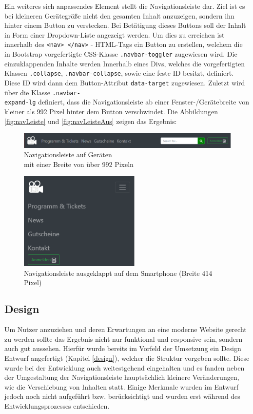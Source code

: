 	Ein weiteres sich anpassendes Element stellt die Navigationsleiste dar. Ziel ist es bei kleineren Gerätegröße nicht den gesamten Inhalt anzuzeigen, sondern ihn hinter einem Button zu verstecken. Bei Betätigung dieses Buttons soll der Inhalt in Form einer Dropdown-Liste angezeigt werden. Um dies zu erreichen ist innerhalb des \texttt{<nav> </nav>} - HTML-Tags ein Button zu erstellen, welchem die in Bootstrap vorgefertigte CSS-Klasse \texttt{.navbar-toggler} zugewiesen wird. Die einzuklappenden Inhalte werden Innerhalb eines Divs, welches die vorgefertigten Klassen \texttt{.collapse}, \texttt{.navbar-collapse}, sowie eine feste ID besitzt, definiert. Diese ID wird dann dem Button-Attribut \texttt{data-target} zugewiesen. Zuletzt wird über die Klasse \texttt{.navbar-\\expand-lg} definiert, dass die Navigationsleiste ab einer Fenster-/Gerätebreite von kleiner als 992 Pixel hinter dem Button verschwindet. Die Abbildungen \vref{fig:navLeiste} und \vref{fig:navLeisteAus} zeigen das Ergebnis:
	\begin{figure}[H]
		\centering 
		\includegraphics[width=13cm]{img/navLeiste.png}
		\captionsetup{format=hang}
		\caption[Navigationsleiste]{\label{fig:navLeiste} Navigationsleiste auf Geräten\\ mit einer Breite von über 992 Pixeln}
	\end{figure}
	
	\begin{figure}[H]
		\centering 
		\includegraphics[width=6cm]{img/navLeisteAus.png}
		\captionsetup{format=hang}
		\caption[Navigationsleiste ausgeklappt]{\label{fig:navLeisteAus} Navigationsleiste ausgeklappt auf dem Smartphone (Breite 414 Pixel)}
	\end{figure}

	\subsection{Design}
	Um Nutzer anzuziehen und deren Erwartungen an eine moderne Website gerecht zu werden sollte das Ergebnis nicht nur funktional und responsive sein, sondern auch gut aussehen. Hierfür wurde bereits im Vorfeld der Umsetzung ein Design Entwurf angefertigt (Kapitel \vref{design}), welcher die Struktur vorgeben sollte. Diese wurde bei der Entwicklung auch weitestgehend eingehalten und es fanden neben der Umgestaltung der Navigationsleiste hauptsächlich kleinere Veränderungen, wie die Verschiebung von Inhalten statt. Einige Merkmale wurden im Entwurf jedoch noch nicht aufgeführt bzw. berücksichtigt und wurden erst während des Entwicklungsprozesses entschieden. 
	
